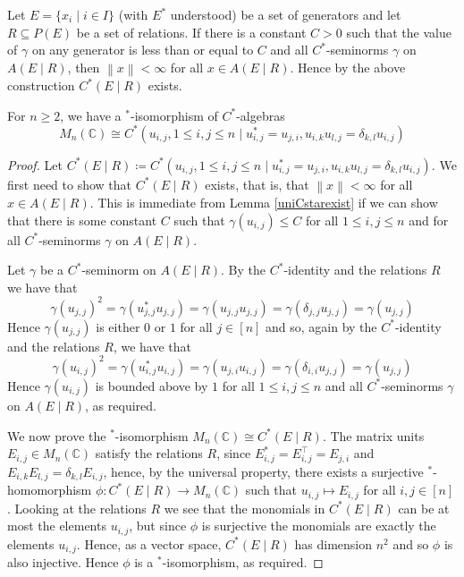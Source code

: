 \documentclass[10pt,a4paper]{amsart}
\newcommand{\norm}[1]{\left\lVert#1\right\rVert}
\begin{document}
\begin{lemma} \label{uniCstarexist}
	Let $E = \{x_i \mid i \in I\}$ (with $E^*$ understood)
	be a set of generators and let $R \subseteq P(E)$ be a set of relations.
	If there is a constant $C > 0$ such that the value of $\gamma$ on any
	generator is less than or equal to $C$
	and all $C^*$-seminorms $\gamma$ on $A(E \mid R)$, then $\norm{x} < \infty$
	for all $x \in A(E \mid R)$.
	Hence by the above construction $C^*(E \mid R)$ exists.
\end{lemma}

\begin{example}
	For $n \geq 2$, we have a $^*$-isomorphism of $C^*$-algebras
	\begin{equation}
		M_n(\mathbb{C})
		\cong
		C^*(u_{i,j}, 1 \leq i,j \leq n \mid
		u_{i,j}^* = u_{j,i},
		u_{i,k}u_{l,j} = \delta_{k,l}u_{i,j}
		)
	\end{equation}
\end{example}

\begin{proof}
	Let $C^*(E \mid R) \coloneqq C^*(u_{i,j}, 1 \leq i,j \leq n \mid
		u_{i,j}^* = u_{j,i},
		u_{i,k}u_{l,j} = \delta_{k,l}u_{i,j}
		)$.
	We first need to show that $C^*(E \mid R)$ exists, that is, 
	that $\norm{x} < \infty$ for all $x \in A(E \mid R)$.
	This is immediate from
	Lemma \ref{uniCstarexist}
	if we can show that there is some constant $C$
	such that $\gamma(u_{i,j}) \leq C$ for all $1 \leq i,j \leq n$ and for all
	$C^*$-seminorms $\gamma$ on $A(E \mid R)$.

	Let $\gamma$ be a $C^*$-seminorm on $A(E \mid R)$.
	By the $C^*$-identity and the relations $R$ we have that
	\begin{equation}
		\gamma(u_{j,j})^2 
		= 
		\gamma(u_{j,j}^*u_{j,j})
		=
		\gamma(u_{j,j}u_{j,j})
		=
		\gamma(\delta_{j,j}u_{j,j})
		=
		\gamma(u_{j,j})
	\end{equation}
	Hence $\gamma({u_{j,j}})$ is either $0$ or $1$ for all $j \in [n]$ and so,
	again by the $C^*$-identity and the relations $R$, we have that
	\begin{equation}
		\gamma(u_{i,j})^2
		=
		\gamma(u_{i,j}^*u_{i,j})
		=
		\gamma(u_{j,i}u_{i,j})
		=
		\gamma(\delta_{i,i}u_{j,j})
		=
		\gamma(u_{j,j})
	\end{equation}
	Hence $\gamma({u_{i,j}})$ is bounded above by $1$ for all $1 \leq i,j \leq n$
	and all $C^*$-seminorms $\gamma$ on $A(E \mid R)$, as required.

	We now prove the $^*$-isomorphism $M_n(\mathbb{C}) \cong C^*(E \mid R)$.
	The matrix units $E_{i,j} \in M_n(\mathbb{C})$
	satisfy the relations $R$, since $E_{i,j}^* = E_{i,j}^\top = E_{j,i}$
	and $E_{i,k}E_{l,j} = \delta_{k,l}E_{i,j}$, hence, by the universal property,
	there exists a surjective $^*$-homomorphism 
	$\phi: C^*(E \mid R) \rightarrow M_n(\mathbb{C})$ such that 
	$u_{i,j} \mapsto E_{i,j}$ for all $i,j \in [n]$.
	Looking at the relations $R$ we see that the monomials in $C^*(E \mid R)$
	can be at most the elements $u_{i,j}$, but since $\phi$ is surjective
	the monomials are exactly the elements $u_{i,j}$. Hence, as a vector space,
	$C^*(E \mid R)$ has dimension $n^2$ and so $\phi$ is also injective.
	Hence $\phi$ is a $^*$-isomorphism, as required.
\end{proof}
\end{document}
